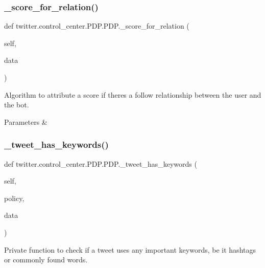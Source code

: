 \subsubsection{\texorpdfstring{\+\_\+score\+\_\+for\+\_\+relation()}{\_score\_for\_relation()}}
{\footnotesize\ttfamily def twitter.\+control\+\_\+center.\+P\+D\+P.\+P\+D\+P.\+\_\+score\+\_\+for\+\_\+relation (\begin{DoxyParamCaption}\item[{}]{self,  }\item[{}]{data }\end{DoxyParamCaption})\hspace{0.3cm}{\ttfamily [private]}}



Algorithm to attribute a score if there\textquotesingle{}s a follow relationship between the user and the bot. 


\begin{DoxyParams}{Parameters}
{\em } & \\
\hline
\end{DoxyParams}
\mbox{\label{classtwitter_1_1control__center_1_1PDP_1_1PDP_a66187cf251e70e9f579406e45eb16137}} 
\subsubsection{\texorpdfstring{\+\_\+tweet\+\_\+has\+\_\+keywords()}{\_tweet\_has\_keywords()}}
{\footnotesize\ttfamily def twitter.\+control\+\_\+center.\+P\+D\+P.\+P\+D\+P.\+\_\+tweet\+\_\+has\+\_\+keywords (\begin{DoxyParamCaption}\item[{}]{self,  }\item[{}]{policy,  }\item[{}]{data }\end{DoxyParamCaption})\hspace{0.3cm}{\ttfamily [private]}}



Private function to check if a tweet uses any important keywords, be it hashtags or commonly found words. 


